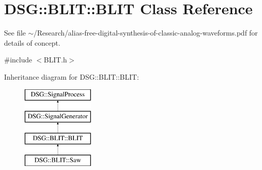 \hypertarget{classDSG_1_1BLIT_1_1BLIT}{\section{D\-S\-G\-:\-:B\-L\-I\-T\-:\-:B\-L\-I\-T Class Reference}
\label{classDSG_1_1BLIT_1_1BLIT}
}


See file $\sim$/\-Research/alias-\/free-\/digital-\/synthesis-\/of-\/classic-\/analog-\/waveforms.pdf for details of concept.  




{\ttfamily \#include $<$B\-L\-I\-T.\-h$>$}

Inheritance diagram for D\-S\-G\-:\-:B\-L\-I\-T\-:\-:B\-L\-I\-T\-:\begin{figure}[H]
\begin{center}
\leavevmode
\includegraphics[height=4.000000cm]{classDSG_1_1BLIT_1_1BLIT}
\end{center}
\end{figure}

